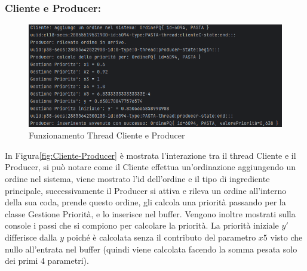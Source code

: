 \subsubsection{Cliente e Producer:}
\begin{figure}[H]
	\centering
	\includegraphics[scale=0.75]{iterazione3/images/Cliente-Producer.png}
	\caption{Funzionamento Thread Cliente e Producer \label{fig:Cliente-Producer}}
\end{figure}
In Figura\vref{fig:Cliente-Producer} è mostrata l'interazione tra il thread Cliente e il Producer, si può notare come il Cliente effettua un'ordinazione aggiungendo un ordine nel sistema, viene mostrato l'id dell'ordine e il tipo di ingrediente principale, successivamente il Producer si attiva e rileva un ordine all'interno della sua coda, prende questo ordine, gli calcola una priorità passando per la classe Gestione Priorità, e lo inserisce nel buffer. Vengono inoltre mostrati sulla console i passi che si compiono per calcolare la priorità. La priorità iniziale $y'$ differisce dalla $y$ poiché è calcolata senza il contributo del parametro $x5$ visto che nullo all'entrata nel buffer (quindi viene calcolata facendo la somma pesata solo dei primi 4 parametri).
